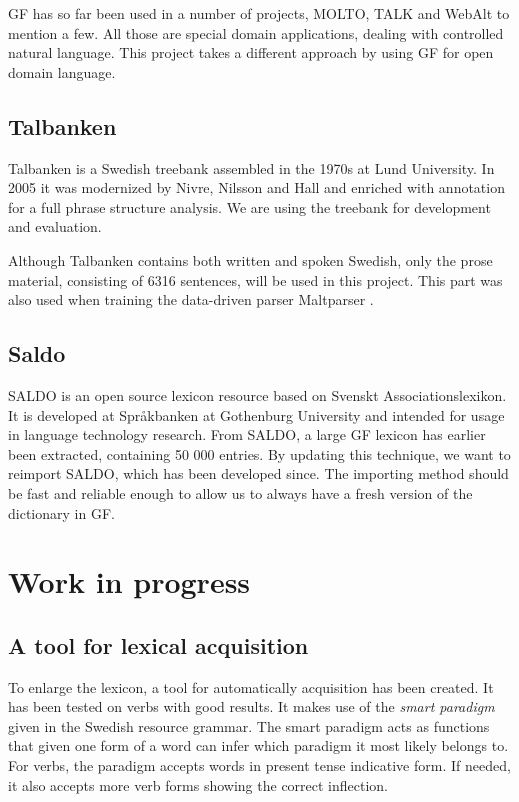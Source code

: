 \documentclass[submission]{eptcs} %
\begin{document}
GF has so far been used in a number of projects, MOLTO\cite{molto}, TALK\cite{talk}
and WebAlt\cite{webalt} to mention a few. 
All those are special domain applications, dealing with controlled natural
language.
This project takes a different approach by using GF for open domain language.



\subsection{Talbanken}
Talbanken\cite{talbanken} is
a Swedish treebank assembled in the 1970s at Lund University.
In 2005 it was modernized by Nivre, Nilsson and Hall\cite{talbanken05} and
enriched with annotation for a full phrase structure analysis. 
We are using the treebank for development and evaluation. 

Although Talbanken contains both written and spoken Swedish,
only the prose material, consisting of 6316 sentences, will be used in this project.
This part was also used when training the data-driven parser Maltparser \cite{malt}. \\

\subsection{Saldo}
SALDO\cite{saldo} is an open source lexicon resource
based on Svenskt Associationslexikon. It is
developed at Språkbanken at Gothenburg University
and intended for usage in language technology
research. 
From SALDO, a large GF lexicon has earlier been extracted,
containing 50 000 entries. By updating this technique, we want
to reimport SALDO, which has been developed since.
The importing method should be fast and reliable
enough to allow us to always have a fresh version of the dictionary
in GF.


\section{Work in progress}
\label{sec:progress}
\subsection{A tool for lexical acquisition}
To enlarge the lexicon, 
a tool for automatically acquisition has been created. It has 
been tested on verbs with good results. It makes use of
the \emph{smart paradigm} given in the Swedish resource grammar.
The smart paradigm acts as functions that given one form of a word can
infer which paradigm it most likely belongs to.
For verbs, the paradigm accepts words in present tense indicative form.
If needed, it also accepts more verb forms showing the correct inflection.
\end{document}
